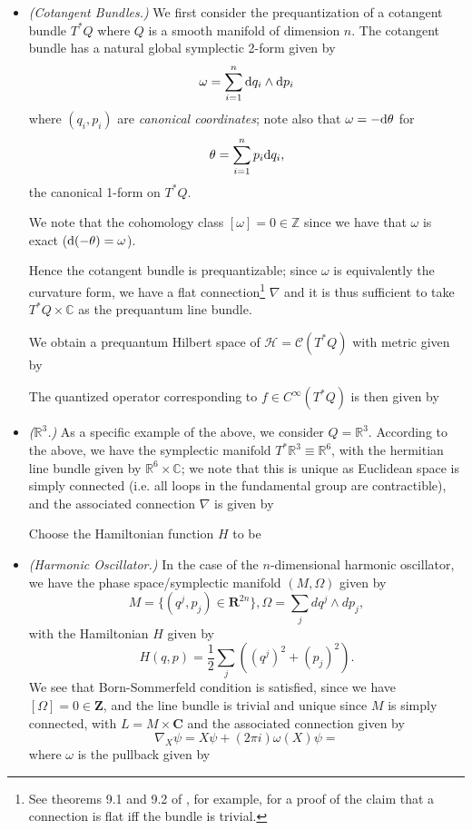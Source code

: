 \begin{itemize}
\item \emph{(Cotangent Bundles.)} We first consider the prequantization of a cotangent bundle $T^*Q$ where $Q$ is a smooth manifold of dimension $n$. The cotangent bundle has a natural global symplectic 2-form given by
$$
\omega = \sum_{i=1}^n \mathrm{d} q_i \wedge \mathrm{d} p_i
$$
where $(q_i,p_i)$ are \emph{canonical coordinates}; note also that $\omega = -\mathrm{d}\theta$ for
$$
\theta = \sum_{i=1}^n p_i \mathrm{d} q_i,
$$
the canonical 1-form on $T^*Q$.

We note that the cohomology class $[\omega] = 0 \in \mathbb{Z}$ since we have that $\omega$ is exact ($\mathrm{d}(-\theta) = \omega$).

Hence the cotangent bundle is prequantizable; since $\omega$ is equivalently the curvature form, we have a flat connection\footnote{See theorems 9.1 and 9.2 of \cite{kobayashinomizu}, for example, for a proof of the claim that a connection is flat iff the bundle is trivial.} $\nabla$ and it is thus sufficient to take $T^*Q \times \mathbb{C}$ as the prequantum line bundle.

We obtain a prequantum Hilbert space of $\mathcal{H} = \mathcal{C}(T^*Q)$ with metric given by %

The quantized operator corresponding to $f \in C^\infty(T^*Q)$ is then given by
$$
$$

\item \emph{($\mathbb{R}^3$.)} As a specific example of the above, we consider $Q = \mathbb{R}^3$. According to the above, we have the symplectic manifold $T^*\mathbb{R}^3 \equiv \mathbb{R}^6$, with the hermitian line bundle given by $\mathbb{R}^6 \times \mathbb{C}$; we note that this is unique as Euclidean space is simply connected (i.e. all loops in the fundamental group are contractible), and the associated connection $\nabla$ is given by %

Choose the Hamiltonian function $H$ to be %



\item \emph{(Harmonic Oscillator.)} In the case of the $n$-dimensional harmonic oscillator, we have the phase space/symplectic manifold $(M,\Omega)$ given by
$$
M = \{(q^j,p_j) \in \mathbf{R}^{2n}\}, \Omega = \sum_j dq^j \wedge dp_j,
$$
with the Hamiltonian $H$ given by
$$
H(q,p) = \frac{1}{2}\sum_j ((q^j)^2 + (p_j)^2).
$$
We see that Born-Sommerfeld condition is satisfied, since we have $[\Omega] = 0 \in \mathbf{Z}$, and the line bundle is trivial and unique since $M$ is simply connected, with $L = M \times \mathbf{C}$ and the associated connection \nabla given by
$$
\nabla_X \psi = X \psi + (2\pi i)\omega(X)\psi = %
$$
where $\omega$ is the pullback given by %


\end{itemize}
